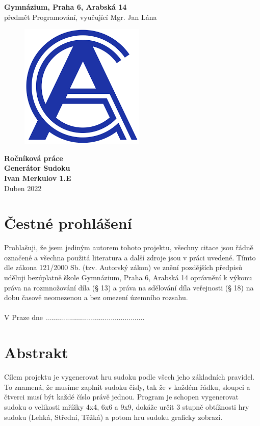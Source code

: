 \documentclass{report}
\begin{document}
\begin{center}
    \huge \textbf{Gymnázium, Praha 6, Arabská 14}\\
    \Large předmět Programování, vyučující Mgr. Jan Lána   
\end{center}


\begin{figure}[h!]
    \centering
    \includegraphics{images/GyarabRP.png}
    \label{fig:GyarabRP}
\end{figure}

\begin{center}
    \huge \textbf{Ročníková práce\\
    \Large Generátor Sudoku}\\
    \Large \textbf{Ivan Merkulov 1.E}\\
    Duben 2022
\end{center}


\chapter*{Čestné prohlášení}
\large Prohlašuji, že jsem jediným autorem tohoto projektu, všechny citace jsou řádně označené a všechna použitá literatura a další zdroje jsou v práci uvedené. Tímto dle zákona 121/2000 Sb. (tzv. Autorský zákon) ve znění pozdějších předpisů uděluji bezúplatně škole Gymnázium, Praha 6, Arabská 14 oprávnění k výkonu práva na rozmnožování díla (§ 13) a práva na sdělování díla veřejnosti (§ 18) na dobu časově neomezenou a bez omezení územního rozsahu.\\
\\
V Praze dne  ..........\hspace{3cm}..........................\hspace{1cm}..............

\chapter*{Abstrakt}
Cílem projektu je vygenerovat hru sudoku podle všech jeho základních pravidel. To znamená, že musíme zaplnit sudoku čísly, tak že v každém řádku, sloupci a čtverci musí být každé číslo právě jednou. Program je schopen vygenerovat sudoku o velikosti mřížky 4x4, 6x6 a 9x9, dokáže určit 3 stupně obtížnosti hry sudoku (Lehká, Střední, Těžká) a potom hru sudoku graficky zobrazí.
\end{document}
